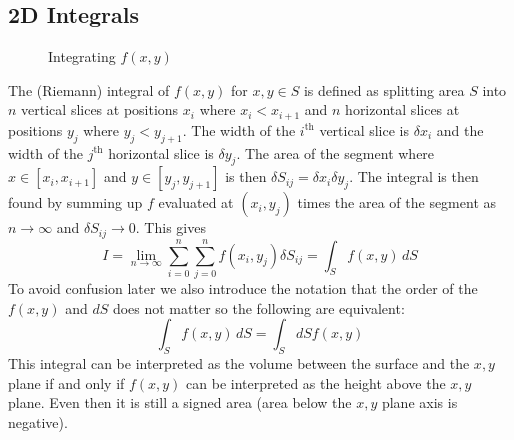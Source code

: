 \documentclass{article}
\begin{document}
    \subsection{2D Integrals}
    \begin{figure}[ht]
        \centering
        \caption{Integrating \(f(x, y)\)}
    \end{figure}
    The (Riemann) integral of \(f(x, y)\) for \(x, y\in S\) is defined as splitting area \(S\) into \(n\) vertical slices at positions \(x_i\) where \(x_i < x_{i + 1}\) and \(n\) horizontal slices at positions \(y_j\) where \(y_j < y_{j + 1}\).
    The width of the \(i^\text{th}\) vertical slice is \(\delta x_i\) and the width of the \(j^\text{th}\) horizontal slice is \(\delta y_j\).
    The area of the segment where \(x\in[x_i, x_{i + 1}]\) and \(y\in[y_j, y_{j + 1}]\) is then \(\delta S_{ij} = \delta x_i\delta y_j\).
    The integral is then found by summing up \(f\) evaluated at \((x_i, y_j)\) times the area of the segment as \(n\to \infty\) and \(\delta S_{ij}\to 0\).
    This gives
    \[I = \lim_{n\to \infty}\sum_{i = 0}^{n}\sum_{j=0}^n f(x_i, y_j)\delta S_{ij} = \int_S f(x, y)\,dS\]
    To avoid confusion later we also introduce the notation that the order of the \(f(x, y)\) and \(dS\) does not matter so the following are equivalent:
    \[\int_S f(x, y)\, dS = \int_S dS f(x, y)\]
    This integral can be interpreted as the volume between the surface and the \(x, y\) plane if and only if \(f(x, y)\) can be interpreted as the height above the \(x, y\) plane.
    Even then it is still a signed area (area below the \(x, y\) plane axis is negative).
    
\end{document}
